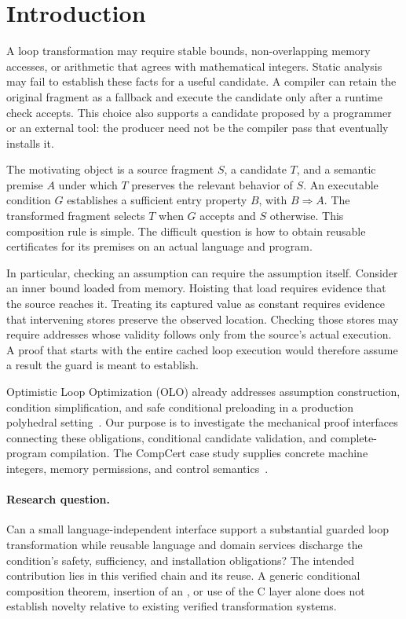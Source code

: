 \section{Introduction}
\label{sec:introduction}

A loop transformation may require stable bounds, non-overlapping memory
accesses, or arithmetic that agrees with mathematical integers. Static analysis
may fail to establish these facts for a useful candidate. A compiler can retain
the original fragment as a fallback and execute the candidate only after a
runtime check accepts. This choice also supports a candidate proposed by a
programmer or an external tool: the producer need not be the compiler pass that
eventually installs it.

The motivating object is a source fragment $S$, a candidate $T$, and a semantic
premise $A$ under which $T$ preserves the relevant behavior of $S$. An executable
condition $G$ establishes a sufficient entry property $B$, with $B\Rightarrow A$.
The transformed fragment selects $T$ when $G$ accepts and $S$ otherwise. This
composition rule is simple. The difficult question is how to obtain reusable
certificates for its premises on an actual language and program.

In particular, checking an assumption can require the assumption itself.
Consider an inner bound loaded from memory. Hoisting that load requires evidence
that the source reaches it. Treating its captured value as constant requires
evidence that intervening stores preserve the observed location. Checking those
stores may require addresses whose validity follows only from the source's
actual execution. A proof that starts with the entire cached loop execution
would therefore assume a result the guard is meant to establish.

Optimistic Loop Optimization (OLO) already addresses assumption construction,
condition simplification, and safe conditional preloading in a production
polyhedral setting~\cite{olo2017}. Our purpose is to investigate the mechanical
proof interfaces connecting these obligations, conditional candidate validation,
and complete-program compilation. The CompCert case study supplies concrete
machine integers, memory permissions, and control semantics~\cite{compcert2009}.

\paragraph{Research question.}
Can a small language-independent interface support a substantial guarded loop
transformation while reusable language and domain services discharge the
condition's safety, sufficiency, and installation obligations? The intended
contribution lies in this verified chain and its reuse. A generic conditional
composition theorem, insertion of an , or use of the C layer alone does
not establish novelty relative to existing verified transformation systems.

